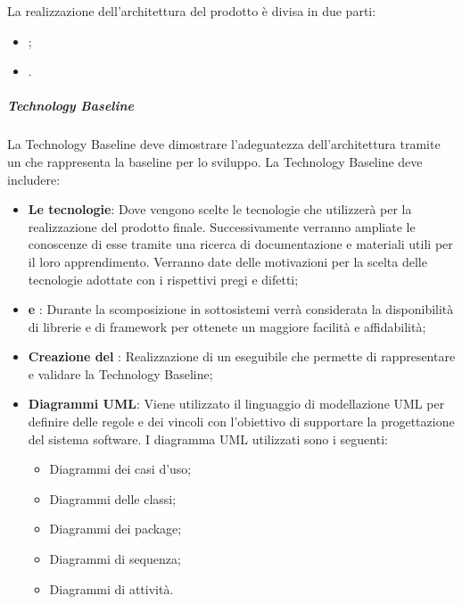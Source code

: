 La realizzazione dell’architettura del prodotto è divisa in due parti:
\begin{itemize}
	\item {};
	\item {}.
\end{itemize}

\subparagraph*{Technology Baseline}
La Technology Baseline deve dimostrare l’adeguatezza dell’architettura tramite un  che rappresenta la baseline per lo sviluppo. 
La Technology Baseline deve includere:
\begin{itemize}
	\item \textbf{Le tecnologie}: Dove vengono scelte le tecnologie che \Gruppo{} utilizzerà per la realizzazione del prodotto finale. Successivamente verranno ampliate le conoscenze di esse tramite una ricerca di documentazione e materiali utili per il loro apprendimento. Verranno date delle motivazioni per la scelta delle tecnologie adottate con i rispettivi pregi e difetti;
	\item \textbf{ e }: Durante la scomposizione in sottosistemi verrà considerata la disponibilità di librerie e di framework per ottenete un maggiore facilità e affidabilità;
	\item \textbf{Creazione del }: Realizzazione di un eseguibile che permette di rappresentare e validare la Technology Baseline;
	\item \textbf{Diagrammi UML}: Viene utilizzato il linguaggio di modellazione UML per definire delle regole e dei vincoli con l'obiettivo di supportare la progettazione del sistema software. I diagramma UML utilizzati sono i seguenti:
	\begin{itemize}
		\item Diagrammi dei casi d'uso; 
		\item Diagrammi delle classi; 
		\item Diagrammi dei package;
		\item Diagrammi di sequenza; 
		\item Diagrammi di attività.
	\end{itemize}
\end{itemize}

